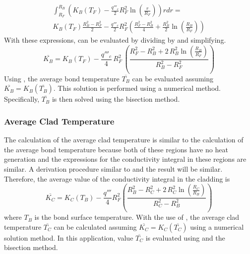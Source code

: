       \begin{multline}
        \label{eq:kb_numerator}
        \int_{R_F}^{R_B} \left( K_B(T_F) - \frac{q'''_c}{2} R_F^2
          \ln\left(\frac{r}{R_F}\right) \right) r dr = \\
        K_B(T_F) \frac{R_B^2-R_F^2}{2} - \frac{q'''_c}{2} R_F^2
          \left( \frac{R_F^2 - R_B^2}{4} + \frac{R_B^2}{2}
          \ln\left(\frac{R_B}{R_F}\right) \right)
      \end{multline}
      With these expressions,  can be evaluated by dividing
       by  and simplifying.
      \begin{equation}
        \label{eq:kb_bar}
        \overline{K_B} = K_B(T_F) - \frac{q'''_c}{4} \, R_F^2 \, \left(
          \frac{R_F^2 - R_B^2 + 2\,R_B^2 \ln\left(\frac{R_B}{R_F}\right)}
          {R_B^2-R_F^2}\right)
      \end{equation}
      Using , the average bond temperature $\overline{T_B}$ can
      be evaluated assuming $\overline{K_B}=K_B(\overline{T_B})$. This solution
      is performed using a numerical method. Specifically, $\overline{T_B}$ is
      then solved using the bisection method.

    \subsubsection{Average Clad Temperature}
      The calculation of the average clad temperature is similar to the
      calculation of the average bond temperature because both of these regions
      have no heat generation and the expressions for the conductivity integral
      in these regions are similar. A derivation procedure similar to
       and the result will be similar. Therefore,
      the average value of the conductivity integral in the cladding is 
      \begin{equation}
        \label{eq:kc_bar}
        \overline{K_C} = K_C(T_B) - \frac{q'''}{4} R_F^2 \left(
          \frac{R_B^2 - R_C^2 + 2 \, R_C^2 \ln\left(\frac{R_C}{R_B}\right)}
          {R_C^2 - R_B^2} \right)
      \end{equation}
      where $T_B$ is the bond surface temperature. With the use of
      , the average clad temperature $\overline{T_C}$ can be
      calculated assuming $\overline{K_C} = K_C(\overline{T_C})$ using a
      numerical solution method. In this application, value $\overline{T_C}$ is
      evaluated using  and the bisection method.

